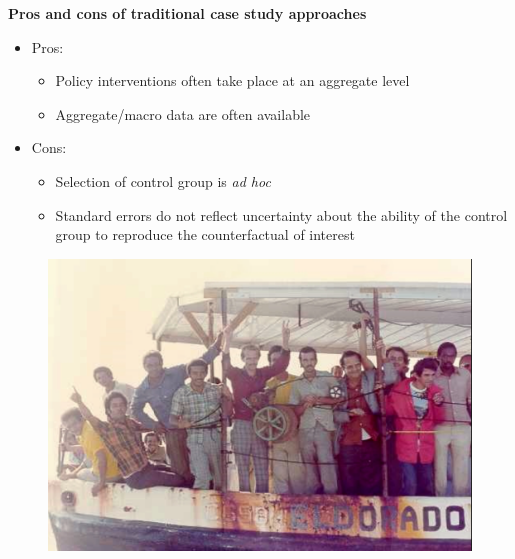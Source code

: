 \documentclass[notes=show]{beamer}
\begin{document}
\begin{frame}[plain]
	\begin{center}
	\textbf{Pros and cons of traditional case study approaches}
	\end{center}
	
	\begin{itemize}
	\item Pros:
		\begin{itemize}
		\item Policy interventions often take place at an aggregate level
		\item Aggregate/macro data are often available
		\end{itemize}
	\item Cons:
		\begin{itemize}
		\item Selection of control group is \emph{ad hoc}
		\item Standard errors do not reflect uncertainty about the ability of the control group to reproduce the counterfactual of interest
		\end{itemize}
	\end{itemize}
\end{frame}



\begin{frame}[plain]
	\begin{figure}
	\includegraphics[scale=0.25]{./lecture_includes/boatlift2}
	\end{figure}
\end{frame}
\end{document}
